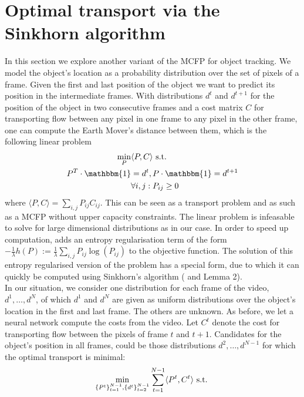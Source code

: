 \documentclass{article}
\begin{document}
{\section{Optimal transport via the Sinkhorn algorithm}\label{Sinkhorn}
In this section we explore another variant of the MCFP for object tracking. We model the object's location as a probability distribution over the set of pixels of a frame. Given the first and last position of the object we want to predict its position in the intermediate frames. With distributions $d^t$ and $d^{t+1}$ for the position of the object in two consecutive frames and a cost matrix $C$ for transporting flow between any pixel in one frame to any pixel in the other frame, one can compute the Earth Mover's distance between them, which is the following linear problem
\begin{align}\label{EMD}
\min_{P} &\langle P, C \rangle \textnormal{ s.t. } \\
 P^T \cdot \mathbbm{1} &= d^t,  P\cdot \mathbbm{1} = d^{t+1} \nonumber\\
&\forall i, j: P_{ij} \geq 0 \nonumber
\end{align}
where $\langle P, C \rangle = \sum_{i,j} P_{ij}C_{ij}$. This can be seen as a transport problem and as such as a MCFP without upper capacity constraints. The linear problem is infeasable to solve for large dimensional distributions as in our case. In order to speed up computation, \cite{Cut13} adds an entropy regularisation term of the form \break $-\frac{1}{\lambda}h(P) := \frac{1}{\lambda}\sum_{i,j} P_{ij}\log(P_{ij})$ to the objective function. The solution of this entropy regularised version of the problem has a special form, due to which it can quickly be computed using Sinkhorn's algorithm (\cite{Sink67} and \cite{Cut13} Lemma 2). \\
In our situation, we consider one distribution for each frame of the video, $d^1, \dots, d^N$, of which $d^1$ and $d^N$ are given as uniform distributions over the object's location in the first and last frame. The others are unknown. As before, we let a neural network compute the costs from the video. Let $C^t$ denote the cost for transporting flow between the pixels of frame $t$ and $t+1$. Candidates for the object's position in all frames, could be those distributions $d^2, \dots, d^{N-1}$ for which the optimal transport is minimal:
\begin{align}\label{EMDtrack}
&\min_{\{P^t\}_{t=1}^{N-1}, \{d^t\}_{t=2}^{N-1}} \sum_{t=1}^{N-1} \langle P^t, C^t\rangle \textnormal{ s.t. }\\

\end{align}}
\end{document}
